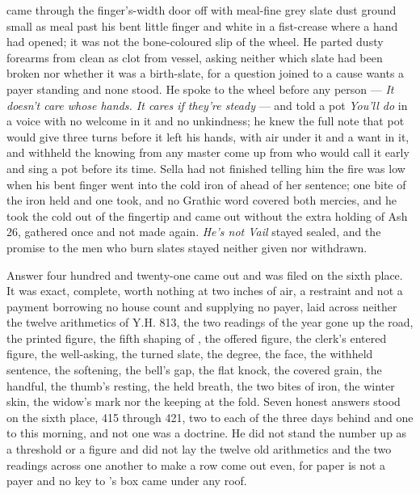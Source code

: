  came through the finger's-width door off  with meal-fine grey slate dust ground small as meal past his bent little finger and white in a fist-crease where a hand had opened; it was not the bone-coloured slip of the wheel. He parted dusty forearms from clean as clot from vessel, asking neither which slate had been broken nor whether it was a birth-slate, for a question joined to a cause wants a payer standing and none stood. He spoke to the wheel before any person --- \emph{It doesn't care whose hands. It cares if they're steady} --- and told a pot \emph{You'll do} in a voice with no welcome in it and no unkindness; he knew the full note that pot would give three turns before it left his hands, with air under it and a want in it, and withheld the knowing from any master come up from  who would call it early and sing a pot before its time. Sella had not finished telling him the fire was low when his bent finger went into the cold iron of  ahead of her sentence; one bite of the iron held and one took, and no Grathic word covered both mercies, and he took the cold out of the fingertip and came out without the extra holding of Ash 26, gathered once and not made again. \emph{He's not Vail} stayed sealed, and the promise to the men who burn slates stayed neither given nor withdrawn.

\scenebreak

Answer four hundred and twenty-one came out and was filed on the sixth place. It was exact, complete, worth nothing at two inches of air, a restraint and not a payment borrowing no house count and supplying no payer, laid across neither the twelve arithmetics of Y.H. 813, the two readings of the year gone up the road, the printed figure, the fifth shaping of , the offered figure, the clerk's entered figure, the well-asking, the turned slate, the degree, the face, the withheld sentence, the softening, the bell's gap, the flat knock, the covered grain, the handful, the thumb's resting, the held breath, the two bites of iron, the winter skin, the widow's mark nor the keeping at the fold. Seven honest answers stood on the sixth place, 415 through 421, two to each of the three days behind and one to this morning, and not one was a doctrine. He did not stand the number up as a threshold or a figure and did not lay the twelve old arithmetics and the two readings across one another to make a row come out even, for paper is not a payer and no key to 's box came under any roof.

